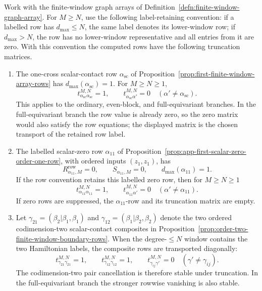 \begin{prop}\label{prop:computed-finite-window-truncation-matrices}
  Work with the finite-window graph arrays of
  Definition~\ref{defn:finite-window-graph-array}.  For \(M\geq N\), use the
  following label-retaining convention: if a labelled row has
  \(d_{\max}\leq N\), the same label denotes its lower-window row; if
  \(d_{\max}>N\), the row has no lower-window representative and all entries
  from it are zero.  With this convention the computed rows have the
  following truncation matrices.

  \begin{enumerate}[label=(T\arabic*)]
    \item The one-cross scalar-contact row
    \(\alpha_{\mathrm{sc}}\) of
    Proposition~\ref{prop:first-finite-window-array-rows} has
    \(d_{\max}(\alpha_{\mathrm{sc}})=1\).  For \(M\geq N\geq1\),
    \[
      t^{M,N}_{\alpha_{\mathrm{sc}}\alpha_{\mathrm{sc}}}=1,
      \qquad
      t^{M,N}_{\alpha_{\mathrm{sc}}\alpha'}=0
      \quad(\alpha'\neq\alpha_{\mathrm{sc}}).
    \]
    This applies to the ordinary, even-block, and full-equivariant branches.
    In the full-equivariant branch the row value is already zero, so the
    zero matrix would also satisfy the row equations; the displayed matrix is
    the chosen transport of the retained row label.

    \item The labelled scalar-zero row \(\alpha_{11}\) of
    Proposition~\ref{prop:app-first-scalar-zero-order-one-row}, with ordered
    inputs \((z_1,z_1)\), has
    \[
      R^{\mathrm{row}}_{\alpha_{11},M}=0,\qquad
      S_{\alpha_{11},M}=0,
      \qquad d_{\max}(\alpha_{11})=1.
    \]
    If the row convention retains this labelled zero row, then for
    \(M\geq N\geq1\)
    \[
      t^{M,N}_{\alpha_{11}\alpha_{11}}=1,
      \qquad
      t^{M,N}_{\alpha_{11}\alpha'}=0
      \quad(\alpha'\neq\alpha_{11}).
    \]
    If zero rows are suppressed, the \(\alpha_{11}\)-row and its truncation
    matrix are empty.

    \item Let
    \(\gamma_{21}=(\beta_2|\beta_1,\beta_1)\) and
    \(\gamma_{12}=(\beta_1|\beta_2,\beta_2)\) denote the two ordered
    codimension-two scalar-contact composites in
    Proposition~\ref{prop:order-two-finite-window-boundary-rows}.  When the
    degree-\(\leq N\) window contains the two Hamiltonian labels, the
    composite rows are transported diagonally:
    \[
      t^{M,N}_{\gamma_{21}\gamma_{21}}=1,\qquad
      t^{M,N}_{\gamma_{12}\gamma_{12}}=1,\qquad
      t^{M,N}_{\gamma_{ij}\gamma'}=0
      \quad(\gamma'\neq\gamma_{ij}).
    \]
    The codimension-two pair cancellation is therefore stable under
    truncation.  In the full-equivariant branch the stronger rowwise
    vanishing is also stable.


\end{enumerate}
\end{prop}

